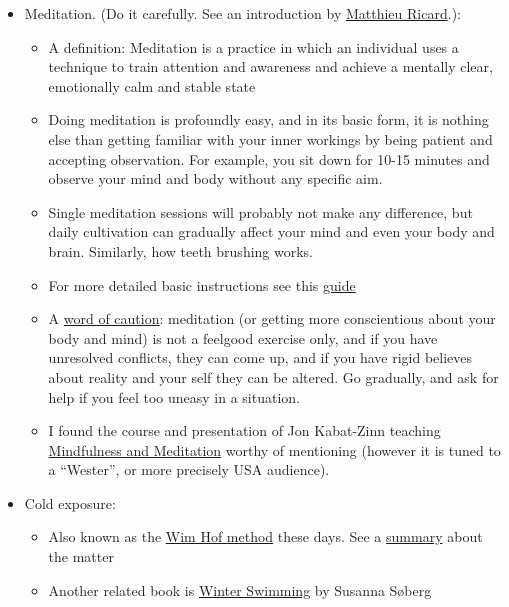 \documentclass{article}
\begin{document}
\begin{itemize}
    \item Meditation. (Do it carefully. See an introduction by \href{https://www.youtube.com/watch?v=P8PCsy268As}{Matthieu Ricard}.):
    \begin{itemize}
    \item A definition: Meditation is a practice in which an individual uses a technique to train attention and awareness and achieve a mentally clear, emotionally calm and stable state
    \item Doing meditation is profoundly easy, and in its basic form, it is nothing else than getting familiar with your inner workings by being patient and accepting observation. For example, you sit down for 10-15 minutes and observe your mind and body without any specific aim.
    \item Single meditation sessions will probably not make any difference, but daily cultivation can gradually affect your mind and even your body and brain. Similarly, how teeth brushing works.
    \item For more detailed basic instructions see this \href{https://www.mindful.org/how-to-meditate/}{guide}
    \item A \href{https://www.sciencefocus.com/news/can-mindfulness-and-meditation-be-harmful/}{word of caution}: meditation (or getting more conscientious about your body and mind) is not a feelgood exercise only, and if you have unresolved conflicts, they can come up, and if you have rigid believes about reality and your self they can be altered. Go gradually, and ask for help if you feel too uneasy in a situation.
    \item I found the course and presentation of Jon Kabat-Zinn teaching \href{https://www.masterclass.com/classes/jon-kabat-zinn-teaches-mindfulness-and-meditation}{Mindfulness and Meditation} worthy of mentioning (however it is tuned to a ``Wester'', or more precisely USA audience).
    \end{itemize}
    \item Cold exposure:
    \begin{itemize}
        \item Also known as the \href{https://www.wimhofmethod.com/}{Wim Hof method} these days. See a \href{https://www.youtube.com/watch?v=D6EPuUdIC1E}{summary} about the matter
        \item Another related book is \href{https://www.goodreads.com/en/book/show/60173751}{Winter Swimming} by Susanna Søberg
        \end{itemize}

\end{itemize}
\end{document}
